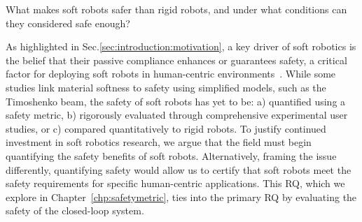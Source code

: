 \begin{researchquestion}\label{rq:soft_robotic_safety}
    What makes soft robots safer than rigid robots, and under what conditions can they considered safe enough?
\end{researchquestion}
As highlighted in Sec.\ref{sec:introduction:motivation}, a key driver of soft robotics is the belief that their passive compliance enhances or guarantees safety, a critical factor for deploying soft robots in human-centric environments~\cite{rus2015design, mengaldo2022concise}. While some studies link material softness to safety using simplified models, such as the Timoshenko beam\cite{abidi2017intrinsic}, the safety of soft robots has yet to be: a) quantified using a safety metric, b) rigorously evaluated through comprehensive experimental user studies, or c) compared quantitatively to rigid robots.
To justify continued investment in soft robotics research, we argue that the field must begin quantifying the safety benefits of soft robots. Alternatively, framing the issue differently, quantifying safety would allow us to certify that soft robots meet the safety requirements for specific human-centric applications.
This \gls{RQ}, which we explore in Chapter~\ref{chp:safetymetric}, ties into the primary \gls{RQ} by evaluating the safety of the closed-loop system.

